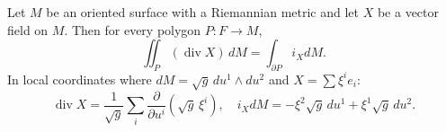 Let $M$ be an oriented surface with a Riemannian metric and let $X$ be a vector field on $M$. Then for every polygon $P: F \to M$,
$$\iint_P (\operatorname{div} X) \, dM = \int_{\partial P} i_X dM.$$
In local coordinates where $dM = \sqrt{g} \, du^1 \wedge du^2$ and $X = \sum \xi^i e_i$:
$$\operatorname{div} X = \frac{1}{\sqrt{g}} \sum_i \frac{\partial}{\partial u^i}(\sqrt{g} \, \xi^i), \quad i_X dM = -\xi^2 \sqrt{g} \, du^1 + \xi^1 \sqrt{g} \, du^2.$$